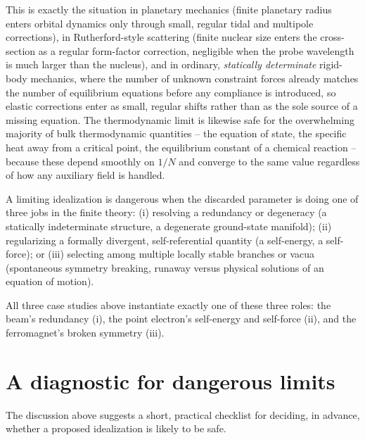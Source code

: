 This is exactly the situation in planetary mechanics (finite
planetary radius enters orbital dynamics only through small,
regular tidal and multipole corrections), in Rutherford-style
scattering (finite nuclear size enters the cross-section as a
regular form-factor correction, negligible when the probe
wavelength is much larger than the nucleus), and in ordinary,
\emph{statically determinate} rigid-body mechanics, where the
number of unknown constraint forces already matches the number
of equilibrium equations before any compliance is introduced, so
elastic corrections enter as small, regular shifts rather than
as the sole source of a missing equation. The thermodynamic
limit is likewise safe for the overwhelming majority of bulk
thermodynamic quantities -- the equation of state, the specific
heat away from a critical point, the equilibrium constant of a
chemical reaction -- because these depend smoothly on $1/N$ and
converge to the same value regardless of how any auxiliary field
is handled.

\begin{principle}
A limiting idealization is dangerous when the discarded
    parameter is doing one of three jobs in the finite theory:
    (i) resolving a redundancy or degeneracy (a statically
    indeterminate structure, a degenerate ground-state
    manifold); (ii) regularizing a formally divergent,
    self-referential quantity (a self-energy, a self-force); or
    (iii) selecting among multiple locally stable branches or
    vacua (spontaneous symmetry breaking, runaway versus
    physical solutions of an equation of motion).
\end{principle}

All three case studies above instantiate exactly one of these
three roles: the beam's redundancy (i), the point electron's
self-energy and self-force (ii), and the ferromagnet's broken
symmetry (iii).

\section{A diagnostic for dangerous limits}
\label{limits:danger}
The discussion above suggests a short, practical checklist for
deciding, in advance, whether a proposed idealization is likely
to be safe.

